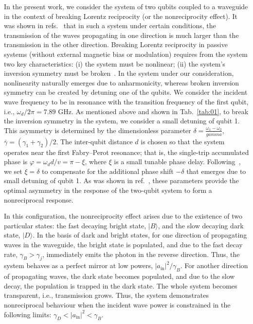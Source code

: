 \documentclass[lettersize,journal]{IEEEtran}
\begin{document}
In the present work, we consider the system of two qubits coupled to a waveguide in the context of breaking Lorentz reciprocity (or the nonreciprocity effect).
It was shown in refs.~\cite{dai_rectification_2015,muller_nonreciprocal_2017,rosario_hamann_nonreciprocity_2018, Nefedkin2022} that in such a system under certain conditions, the transmission of the waves propagating in one direction is much larger than the transmission in the other direction.
Breaking Lorentz reciprocity in passive systems (without external magnetic bias or modulation) requires from the system two key characteristics: (i) the system must be nonlinear; (ii) the system's inversion symmetry must be broken~\cite{cotrufo2021nonlinearity1}.
In the system under our consideration, nonlinearity naturally emerges due to anharmonicity, whereas broken inversion symmetry can be created by detuning one of the qubits.
We consider the incident wave frequency to be in resonance with the transition frequency of the first qubit, i.e., $\omega_d / 2\pi = 7.89$ GHz.
As mentioned above and shown in Tab.~\ref{tab:01}, to break the inversion symmetry in the system, we consider a small detuning of qubit 1.
This asymmetry is determined by the dimensionless parameter $\delta = \frac{\omega_1 - \omega_2}{\bar{gamma}}$, $\bar{\gamma} = (\gamma_1 + \gamma_2) / 2$.
The inter-qubit distance $d$ is chosen so that the system operates near the first Fabry–Perot resonance; that is, the single-trip accumulated phase is $\varphi = \omega_d d / v = \pi - \xi$, where $\xi$ is a small tunable phase delay. 
Following~\cite{dai_rectification_2015,muller_nonreciprocal_2017}, we set $\xi = \delta$ to compensate for the additional phase shift $-\delta$ that emerges due to small detuning of qubit 1. 
As was shown in ref.~\cite{muller_nonreciprocal_2017}, these parameters provide the optimal asymmetry in the response of the two-qubit system to form a nonreciprocal response.

In this configuration, the nonreciprocity effect arises due to the existence of two particular states: the fast decaying bright state, $|B\rangle$, and the slow decaying dark state, $|D\rangle$.
In the basis of dark and bright states, for one direction of propagating waves in the waveguide, the bright state is populated, and due to the fast decay rate, $\gamma_B > \gamma_j$, immediately emits the photon in the reverse direction. 
Thus, the system behaves as a perfect mirror at low powers, $|a_\mathrm{in}|^2 / \gamma_B$.
For another direction of propagating waves, the dark state becomes populated, and due to the slow decay, the population is trapped in the dark state. 
The whole system becomes transparent, i.e., transmission grows.
Thus, the system demonstrates nonreciprocal behaviour when the incident wave power is constrained in the following limits: $ \gamma_D < |a_\mathrm{in}|^2 < \gamma_B$.
\end{document}
